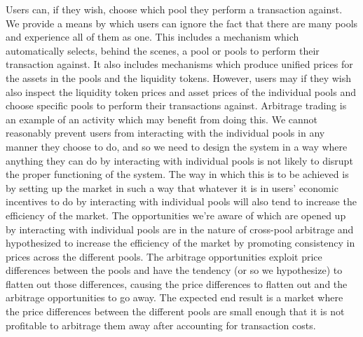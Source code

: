 \documentclass[12pt]{article}
\begin{document}
Users can, if they wish, choose which pool they perform a transaction against.
We provide a means by which users can ignore the fact that there are many pools
and experience all of them as one.  This includes a mechanism which
automatically selects, behind the scenes, a pool or pools to perform their
transaction against. It also includes mechanisms which produce unified prices
for the assets in the pools and the liquidity tokens. However, users may if they
wish also inspect the liquidity token prices and asset prices of the individual
pools and choose specific pools to perform their transactions against. Arbitrage
trading is an example of an activity which may benefit from doing this.  We
cannot reasonably prevent users from interacting with the individual pools in
any manner they choose to do, and so we need to design the system in a way where
anything they can do by interacting with individual pools is not likely to
disrupt the proper functioning of the system. The way in which this is to be
achieved is by setting up the market in such a way that whatever it is in users'
economic incentives to do by interacting with individual pools will also tend to
increase the efficiency of the market. The opportunities we're aware of which
are opened up by interacting with individual pools are in the nature of
cross-pool arbitrage and hypothesized to increase the efficiency of the market
by promoting consistency in prices across the different pools. The arbitrage
opportunities exploit price differences between the pools and have the tendency
(or so we hypothesize) to flatten out those differences, causing the price
differences to flatten out and the arbitrage opportunities to go away. The
expected end result is a market where the price differences between the
different pools are small enough that it is not profitable to arbitrage them
away after accounting for transaction costs.
\end{document}
